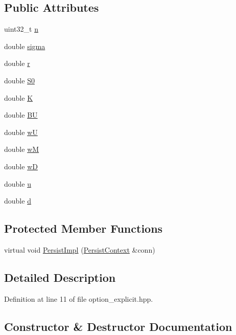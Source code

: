 \subsection*{Public Attributes}
\begin{DoxyCompactItemize}
\item 
uint32\+\_\+t \hyperlink{a00019_a8229929ea9085758f2b07d660bb7b8f7}{n}
\item 
double \hyperlink{a00019_a56e89fa1af7238d063567f8e54e9b49d}{sigma}
\item 
double \hyperlink{a00019_a861b90050a79636ffc94285b5505b846}{r}
\item 
double \hyperlink{a00019_a4a979b31b57f6aed0f4dce571d723058}{S0}
\item 
double \hyperlink{a00019_a6392346a0097d7dbb1e4bb2a57bd0106}{K}
\item 
double \hyperlink{a00019_a46213de8aecf16090bd483bbcea0e253}{B\+U}
\item 
double \hyperlink{a00019_aa88914b775e5c395165a60ff586f656d}{w\+U}
\item 
double \hyperlink{a00019_a30eb51f7bebca47bbc6bcde042f0d26a}{w\+M}
\item 
double \hyperlink{a00019_a2f19480aac3d3de9505fb5c6e167ae89}{w\+D}
\item 
double \hyperlink{a00019_af9884280ea6d8fc1e06250db7be0e992}{u}
\item 
double \hyperlink{a00019_a3bb416e83af6b23662ab14c44573a5f5}{d}
\end{DoxyCompactItemize}
\subsection*{Protected Member Functions}
\begin{DoxyCompactItemize}
\item 
virtual void \hyperlink{a00019_a78cdcb5ed6a8de32bde00116de526700}{Persist\+Impl} (\hyperlink{a00025}{Persist\+Context} \&conn)
\end{DoxyCompactItemize}


\subsection{Detailed Description}


Definition at line 11 of file option\+\_\+explicit.\+hpp.



\subsection{Constructor \& Destructor Documentation}
\hypertarget{a00019_a497e9ab54a4c7a17a5e8176d7699d668}{}
